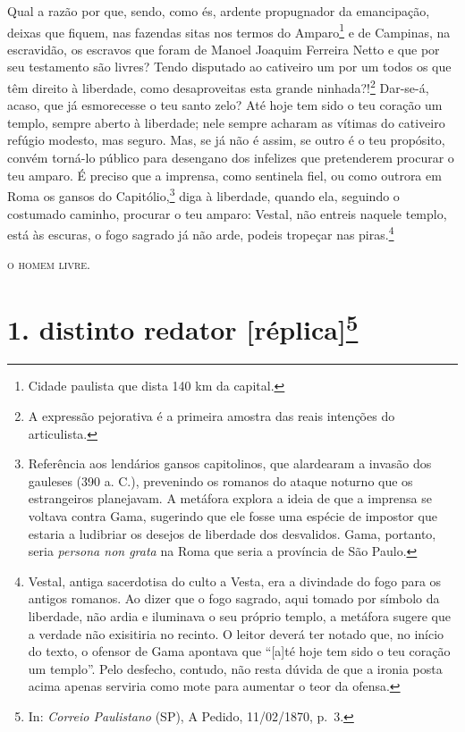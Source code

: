 \asterisc{}

Qual a razão por que, sendo, como és, ardente propugnador da
emancipação, deixas que fiquem, nas fazendas sitas nos termos do
Amparo\footnote{ Cidade paulista que dista 140 km da capital.} e de
Campinas, na escravidão, os escravos que foram de Manoel Joaquim
Ferreira Netto e que por seu testamento são livres? Tendo disputado ao
cativeiro um por um todos os que têm direito à liberdade, como
desaproveitas esta grande ninhada?!\footnote{ A expressão pejorativa é
  a primeira amostra das reais intenções do articulista.} Dar-se-á,
acaso, que já esmorecesse o teu santo zelo? Até hoje tem sido o teu
coração um templo, sempre aberto à liberdade; nele sempre acharam as
vítimas do cativeiro refúgio modesto, mas seguro. Mas, se já não é
assim, se outro é o teu propósito, convém torná-lo público para
desengano dos infelizes que pretenderem procurar o teu amparo. É preciso
que a imprensa, como sentinela fiel, ou como outrora em Roma os gansos
do Capitólio,\footnote{ Referência aos lendários gansos capitolinos,
  que alardearam a invasão dos gauleses (390 a. C.), prevenindo os
  romanos do ataque noturno que os estrangeiros planejavam. A metáfora
  explora a ideia de que a imprensa se voltava contra Gama, sugerindo
  que ele fosse uma espécie de impostor que estaria a ludibriar os
  desejos de liberdade dos desvalidos. Gama, portanto, seria
  \emph{persona non grata} na Roma que seria a província de São Paulo.}
diga à liberdade, quando ela, seguindo o costumado caminho, procurar o
teu amparo: Vestal, não entreis naquele templo, está às escuras, o fogo
sagrado já não arde, podeis tropeçar nas piras.\footnote{ Vestal,
  antiga sacerdotisa do culto a Vesta, era a divindade do fogo para os
  antigos romanos. Ao dizer que o fogo sagrado, aqui tomado por símbolo
  da liberdade, não ardia e iluminava o seu próprio templo, a metáfora
  sugere que a verdade não exisitiria no recinto. O leitor deverá ter
  notado que, no início do texto, o ofensor de Gama apontava que
  ``{[}a{]}té hoje tem sido o teu coração um templo''. Pelo desfecho,
  contudo, não resta dúvida de que a ironia posta acima apenas serviria
  como mote para aumentar o teor da ofensa.}
\begin{flushright}
\textsc{o homem livre}.
\end{flushright}
\chapter{1. distinto redator {[}réplica{]}\footnote{ In: \emph{Correio Paulistano} (SP), A Pedido, 11/02/1870,
  p.~3.}} %


